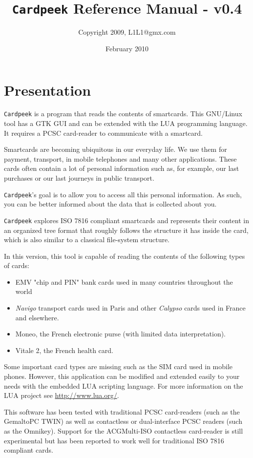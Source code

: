 \documentclass[11pt]{report}
\title{\texttt{Cardpeek} Reference Manual - v0.4}
\author{Copyright 2009, L1L1@gmx.com}
\date{February 2010}
\begin{document}
\maketitle

\chapter*{Presentation}

\texttt{Cardpeek} is a program that reads the contents of smartcards. 
This GNU/Linux tool has a GTK GUI and can be extended with the LUA programming language. 
It requires a PCSC card-reader to communicate with a smartcard.

Smartcards are becoming ubiquitous in our everyday life. 
We use them for payment, transport, in mobile telephones and many other applications.
These cards often contain a lot of personal information such as, for example, our last purchases or our last journeys in public transport.

\texttt{Cardpeek}'s goal is to allow you to access all this personal information. As such, you can be better informed about the data that is collected about you.

\texttt{Cardpeek} explores ISO 7816 compliant smartcards and represents their content in an organized tree format that roughly follows the structure it has inside the card, which is also similar to a classical file-system structure.

In this version, this tool is capable of reading the contents of the following types of cards:
\begin{itemize}
\item{EMV "chip and PIN" bank cards used in many countries throughout the world}
\item{\textit{Navigo} transport cards used in Paris and other \textit{Calypso} cards used in France and elsewhere.}
\item{Moneo, the French electronic purse (with limited data interpretation).}
\item{Vitale 2, the French health card.}
\end{itemize}

Some important card types are missing such as the SIM card used in mobile phones.
However, this application can be modified and extended easily to your needs with the embedded LUA scripting language.
For more information on the LUA project see \url{http://www.lua.org/}.

This software has been tested with traditional PCSC card-readers (such as the Gemalto\texttrademark PC TWIN) as well as contactless or dual-interface PCSC readers (such as the Omnikey). 
Support for the ACG\texttrademark Multi-ISO contactless card-reader is still experimental but has been reported to work well for traditional ISO 7816 compliant cards.
\end{document}
